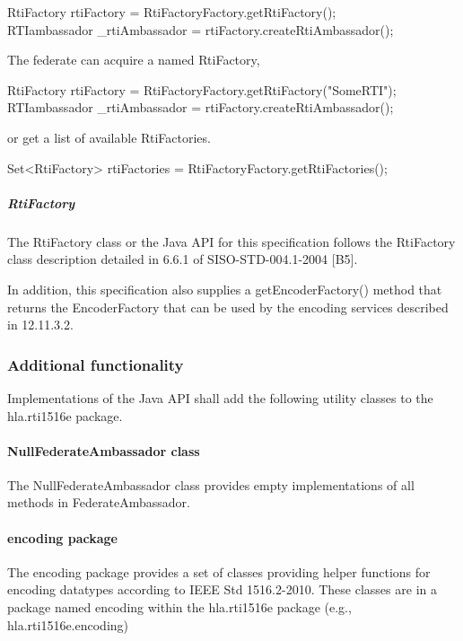 \begin{compactstdpage}
{\ttfamily\fontsize{8.7}{10}\selectfont
RtiFactory rtiFactory = RtiFactoryFactory.getRtiFactory();\\
RTIambassador \_rtiAmbassador = rtiFactory.createRtiAmbassador();}

    The federate can acquire a named RtiFactory,

        {\ttfamily\fontsize{8.7}{10}\selectfont
    RtiFactory rtiFactory = RtiFactoryFactory.getRtiFactory("SomeRTI");\\
    RTIambassador \_rtiAmbassador = rtiFactory.createRtiAmbassador();}

    or get a list of available RtiFactories.

        {\ttfamily\fontsize{8.7}{10}\selectfont Set\textless{}RtiFactory\textgreater{} rtiFactories = RtiFactoryFactory.getRtiFactories();}

    \subparagraph{RtiFactory}

    The RtiFactory class or the Java API for this specification follows the RtiFactory class description detailed in 6.6.1 of SISO-STD-004.1-2004 [B5].

    In addition, this specification also supplies a getEncoderFactory() method that returns the EncoderFactory that can be used by the encoding services described in 12.11.3.2.

    \subsubsection{Additional functionality}

    Implementations of the Java API shall add the following utility classes to the hla.rti1516e package.

    \paragraph{NullFederateAmbassador class}

    The NullFederateAmbassador class provides empty implementations of all methods in FederateAmbassador.

    \paragraph{encoding package}

    The encoding package provides a set of classes providing helper functions for encoding datatypes according to IEEE Std 1516.2-2010. These classes are in a package named encoding within the hla.rti1516e package (e.g., hla.rti1516e.encoding)


\end{compactstdpage}
